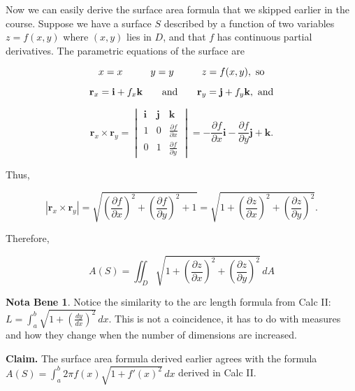 \documentclass[11pt,oneside,english]{amsart}
\theoremstyle{definition}
\newtheorem*{note}{Nota Bene}
\newcommand{\aspace}{\hspace{7mm}\text{and}\hspace{7mm}}
\newcommand{\pspace}{\hspace{10mm}}
\newcommand{\dd}[2]{\frac{d{#1}}{d{#2}}}
\newcommand{\pp}[2]{\frac{\partial{#1}}{\partial{#2}}}
\begin{document}
Now we can easily derive the surface area formula that we skipped earlier in the course. Suppose we have a surface $S$ described by a function of two variables $z=f(x,y)$ where $(x,y)$ lies in $D$, and that $f$ has continuous partial derivatives. The parametric equations of the surface are

\[
x=x\pspace y=y\pspace z=f(x,y),\text{ so}
\]

\[
\mathbf{r}_x=\mathbf{i}+f_x\mathbf{k}\aspace \mathbf{r}_y=\mathbf{j}+f_y\mathbf{k},\text{ and}
\]

\[
\mathbf{r}_x\times\mathbf{r}_y=\begin{vmatrix}\mathbf{i}&\mathbf{j}&\mathbf{k}\\ 1& 0 & \pp{f}{x}\\ 0 & 1 & \pp{f}{y}\end{vmatrix}=-\pp{f}{x}\mathbf{i}-\pp{f}{y}\mathbf{j}+\mathbf{k}.
\]

Thus,

\[
|\mathbf{r}_x\times \mathbf{r}_y|=\sqrt{\left(\pp{f}{x}\right)^2+\left(\pp{f}{y}\right)^2+1}=\sqrt{1+\left(\pp{z}{x}\right)^2+\left(\pp{z}{y}\right)^2}.
\]

Therefore, 

\[\boxed{
A(S)=\iint_D\sqrt{1+\left(\pp{z}{x}\right)^2+\left(\pp{z}{y}\right)^2}\,dA}
\]

\begin{note}
Notice the similarity to the arc length formula from Calc II: $\displaystyle L=\int_a^b\sqrt{1+\left(\dd{y}{x}\right)^2}\,dx$. This is not a coincidence, it has to do with measures and how they change when the number of dimensions are increased.
\end{note}

\pagebreak

\textbf{Claim.} The surface area formula derived earlier agrees with the formula $\displaystyle A(S)=\int_a^b2\pi f(x)\sqrt{1+f'(x)^2}\,dx$ derived in Calc II.
\end{document}
